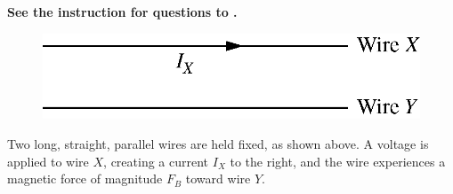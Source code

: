 \textbf{See the instruction for questions  to .}

\begin{figure}[H]
    \center
    \includegraphics[scale=0.25]{images/img-003-005.png}
\end{figure}

Two long, straight, parallel wires are held fixed, as shown above. A voltage is applied to wire $X$, creating a current $I_{X}$ to the right, and the wire experiences a magnetic force of magnitude $F_{B}$ toward wire $Y$.

